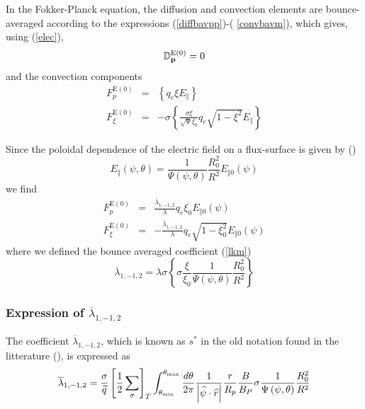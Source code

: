 

\label{FPEfield}In the Fokker-Planck equation, the diffusion and convection
elements are bounce-averaged according to the expressions (\ref{diffbavpp})-(%
\ref{convbavm}), which gives, using (\ref{elec}),
\begin{equation}
\Bbb{D}_{\mathbf{p}}^{\text{E}(0)}=0
\end{equation}
and the convection components
\begin{eqnarray}
F_{p}^{\text{E}(0)} &=&\left\{ q_{e}\xi E_{\Vert }\right\}  \\
F_{\xi }^{\text{E}(0)} &=&-\sigma \left\{ \frac{\sigma \xi }{\sqrt{\Psi }\xi
_{0}}q_{e}\sqrt{1-\xi ^{2}}E_{\Vert }\right\}
\end{eqnarray}

Since the poloidal dependence of the electric field on a flux-surface is
given by ()
\begin{equation}
E_{\Vert }\left( \psi ,\theta \right) =\frac{1}{\Psi \left( \psi ,\theta
\right) }\frac{R_{0}^{2}}{R^{2}}E_{\Vert 0}\left( \psi \right)
\end{equation}
we find
\begin{eqnarray}
F_{p}^{\text{E}(0)} &=&\frac{\overline{\lambda }_{1,-1,2}}{\lambda }q_{e}\xi
_{0}E_{\Vert 0}\left( \psi \right)  \\
F_{\xi }^{\text{E}(0)} &=&-\frac{\overline{\lambda }_{1,-1,2}}{\lambda }q_{e}%
\sqrt{1-\xi _{0}^{2}}E_{\Vert 0}\left( \psi \right)
\end{eqnarray}
where we defined the bounce averaged coefficient (\ref{lkm})
\begin{equation}
\overline{\lambda }_{1,-1,2}=\lambda \sigma \left\{ \sigma \frac{\xi }{\xi
_{0}}\frac{1}{\Psi \left( \psi ,\theta \right) }\frac{R_{0}^{2}}{R^{2}}%
\right\}
\end{equation}

\subsubsection{Expression of $\overline{\lambda }_{1,-1,2}$}

The coefficient $\overline{\lambda }_{1,-1,2}$, which is known as $s^{*}$ in
the old notation found in the litterature (\cite{kil86}), is expressed as
\begin{equation}
\overline{\lambda }_{1,-1,2}=\frac{\sigma }{\widetilde{q}}\left[ \frac{1}{2}
\sum_{\sigma }\right] _{T}\int_{\theta _{\min }}^{\theta _{\max }}\frac{%
d\theta }{2\pi }\frac{1}{\left| \widehat{\psi }\cdot \widehat{r}\right| }%
\frac{r}{R_{p}}\frac{B}{B_{P}}\sigma \frac{1}{\Psi \left( \psi ,\theta
\right) }\frac{R_{0}^{2}}{R^{2}}
\end{equation}

